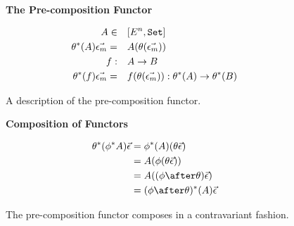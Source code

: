 \begin{figure}
    \begin{minipage}{0.47\linewidth}
        \begin{framed}
            \centering
            \textbf{The Pre-composition Functor}
    
            \begin{align*}
                A\in&\quad [E^n, \texttt{Set}]\\
                \theta^*(A) \vec{\epsilon_m} =&\quad  A(\theta(\vec{\epsilon_m}))\\
                f:&\quad A \rightarrow B\\
                \theta^*(f) \vec{\epsilon_m} =&\quad f(\theta(\vec{\epsilon_m})): \theta^*(A) \rightarrow \theta^*(B)
            \end{align*}
        \end{framed}
        \caption{A description of the pre-composition functor.}
        \label{PrecompositionFunctor}
    \end{minipage}
    \quad
    \begin{minipage}{0.47\linewidth}
        \begin{framed}
            \centering
            \textbf{Composition of Functors}
    
            \begin{align*}
                \theta\star(\phi\star A) \ev & = \phi\star(A)(\theta \ev)\\
                & = A(\phi(\theta\ev))\\
                & = A((\phi\after\theta) \ev)\\
                & = (\phi\after\theta)\star(A) \ev
            \end{align*}
        \end{framed}
    
        \caption{The pre-composition functor composes in a contravariant fashion.}
        \label{PrecompositionFunctorComposition}
    \end{minipage}
\end{figure}




